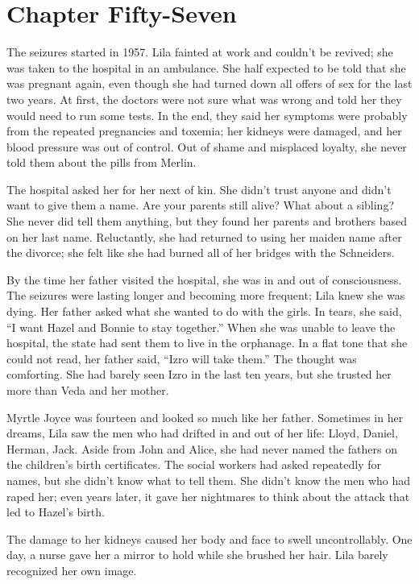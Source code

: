 \documentclass[
  american,
  letterpaper,
]{book}
\begin{document}

\chapter{Chapter Fifty-Seven}\label{chapter-fifty-seven}

The seizures started in 1957. Lila fainted at work and couldn't be
revived; she was taken to the hospital in an ambulance. She half
expected to be told that she was pregnant again, even though she had
turned down all offers of sex for the last two years. At first, the
doctors were not sure what was wrong and told her they would need to run
some tests. In the end, they said her symptoms were probably from the
repeated pregnancies and toxemia; her kidneys were damaged, and her
blood pressure was out of control. Out of shame and misplaced loyalty,
she never told them about the pills from Merlin.

The hospital asked her for her next of kin. She didn't trust anyone and
didn't want to give them a name. Are your parents still alive? What
about a sibling? She never did tell them anything, but they found her
parents and brothers based on her last name. Reluctantly, she had
returned to using her maiden name after the divorce; she felt like she
had burned all of her bridges with the Schneiders.

By the time her father visited the hospital, she was in and out of
consciousness. The seizures were lasting longer and becoming more
frequent; Lila knew she was dying. Her father asked what she wanted to
do with the girls. In tears, she said, ``I want Hazel and Bonnie to stay
together.'' When she was unable to leave the hospital, the state had
sent them to live in the orphanage. In a flat tone that she could not
read, her father said, ``Izro will take them.'' The thought was
comforting. She had barely seen Izro in the last ten years, but she
trusted her more than Veda and her mother.

Myrtle Joyce was fourteen and looked so much like her father. Sometimes
in her dreams, Lila saw the men who had drifted in and out of her life:
Lloyd, Daniel, Herman, Jack. Aside from John and Alice, she had never
named the fathers on the children's birth certificates. The social
workers had asked repeatedly for names, but she didn't know what to tell
them. She didn't know the men who had raped her; even years later, it
gave her nightmares to think about the attack that led to Hazel's birth.

The damage to her kidneys caused her body and face to swell
uncontrollably. One day, a nurse gave her a mirror to hold while she
brushed her hair. Lila barely recognized her own image.
\end{document}
